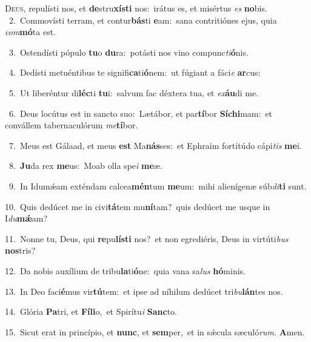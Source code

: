 \lettrine{\initial\textcolor{\initialcolor}{D}}{eus,} repulísti nos, et \textbf{de}\-stru\-\textbf{xís}\-\textbf{ti} nos:~\star irátus es, et misértus \textit{es} \textbf{no}\-bis.\\
{\numbfont\textcolor{\numbcolor}{~2.}}~Commovísti terram, et contur\-\textbf{bás}\-ti \textbf{e}\-am:~\star sana contritiónes ejus, quia \textit{com}\-\textbf{mó}ta est.\par
{\numbfont\textcolor{\numbcolor}{~3.}}~Ostendísti pópulo \textbf{tu}\-o \textbf{du}\-ra:~\star potásti nos vino compunc\-\textit{ti}\-\textbf{ó}nis.\par
{\numbfont\textcolor{\numbcolor}{~4.}}~Dedísti metuéntibus te signifi\-\textbf{ca}\-ti\-\textbf{ó}\-nem:~\star ut fúgiant a fáci\textit{e} \textbf{ar}\-cus:\par
{\numbfont\textcolor{\numbcolor}{~5.}}~Ut liberéntur di\-\textbf{léc}\-ti \textbf{tu}\-i:~\star salvum fac déxtera tua, et \textit{ex}\-\textbf{áu}di me.\par
{\numbfont\textcolor{\numbcolor}{~6.}}~Deus locútus est in sancto suo:~\dagger Lætábor, et par\-\textbf{tí}\-bor \textbf{Sí}\-\textbf{chi}mam:~\star et convállem tabernaculórum \textit{me}\-\textbf{tí}bor.\par
{\numbfont\textcolor{\numbcolor}{~7.}}~Meus est Gálaad, et meus \textbf{est} Ma\-\textbf{nás}\-ses:~\star et Ephraim fortitúdo cápi\textit{tis} \textbf{me}\-i.\par
{\numbfont\textcolor{\numbcolor}{~8.}}~\-\textbf{Ju}\-da rex \textbf{me}\-us:~\star Moab olla spe\textit{i} \textbf{me}\-æ.\par
{\numbfont\textcolor{\numbcolor}{~9.}}~In Idumǽam exténdam calcea\-\textbf{mén}\-tum \textbf{me}\-um:~\star mihi alienígenæ súb\-\textit{di}\-\textbf{ti} sunt.\par
{\numbfont\textcolor{\numbcolor}{10.}}~Quis dedúcet me in civi\-\textbf{tá}\-tem mu\-\textbf{ní}\-tam?~\star quis dedúcet me usque in I\-\textit{du}\-\textbf{mǽ}am?\par
{\numbfont\textcolor{\numbcolor}{11.}}~Nonne tu, Deus, qui \textbf{re}\-pu\-\textbf{lís}\-\textbf{ti} nos?~\star et non egrediéris, Deus in virtúti\textit{bus} \textbf{nos}\-tris?\par
{\numbfont\textcolor{\numbcolor}{12.}}~Da nobis auxílium de tribu\-\textbf{la}\-ti\-\textbf{ó}\-ne:~\star quia vana sa\textit{lus} \textbf{hó}\-minis.\par
{\numbfont\textcolor{\numbcolor}{13.}}~In Deo faci\-\textbf{é}\-mus vir\-\textbf{tú}\-tem:~\star et ipse ad níhilum dedúcet tri\-\textit{bu}\-\textbf{lán}tes nos.\par
{\numbfont\textcolor{\numbcolor}{14.}}~Glória \textbf{Pa}\-tri, et \textbf{Fí}\-\textbf{li}o,~\star et Spirítu\textit{i} \textbf{Sanc}\-to.\par
{\numbfont\textcolor{\numbcolor}{15.}}~Sicut erat in princípio, et \textbf{nunc}\-, et \textbf{sem}\-per,~\star et in sǽcula sæculó\-\textit{rum}\-. \textbf{A}\-men.\par
